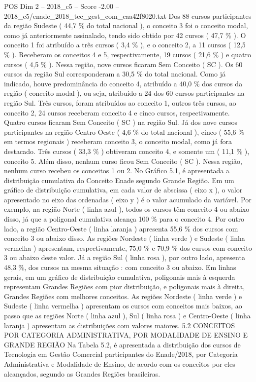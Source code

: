 \begin{textsample}{POS Dim 2 – 2018\_c5 – Score -2.00 – 2018\_c5/enade\_2018\_tec\_gest\_com\_caa42f8020.txt}
Dos 88 cursos participantes da região Sudeste ( 44,7 \% do total nacional ), o conceito 3 foi o conceito modal, como já anteriormente assinalado, tendo sido obtido por 42 cursos ( 47,7 \% ).
O conceito 1 foi atribuído a três cursos ( 3,4 \% ), e o conceito 2, a 11 cursos ( 12,5 \% ).
Receberam os conceitos 4 e 5, respectivamente, 19 cursos ( 21,6 \% ) e quatro cursos ( 4,5 \% ).
Nessa região, nove cursos ficaram Sem Conceito ( SC ).
Os 60 cursos da região Sul corresponderam a 30,5 \% do total nacional.
Como já indicado, houve predominância do conceito 4, atribuído a 40,0 \% dos cursos da região ( conceito modal ), ou seja, atribuído a 24 dos 60 cursos participantes na região Sul.
Três cursos, foram atribuídos ao conceito 1, outros três cursos, ao conceito 2, 24 cursos receberam conceito 4 e cinco cursos, respectivamente.
Quatro cursos ficaram Sem Conceito ( SC ) na região Sul.
Já dos nove cursos participantes na região Centro-Oeste ( 4,6 \% do total nacional ), cinco ( 55,6 \% em termos regionais ) receberam conceito 3, o conceito modal, como já fora destacado.
Três cursos ( 33,3 \% ) obtiveram conceito 4, e somente um ( 11,1 \% ), conceito 5.
Além disso, nenhum curso ficou Sem Conceito ( SC ).
Nessa região, nenhum curso recebeu os conceitos 1 ou 2.
No Gráfico 5.1, é apresentada a distribuição cumulativa do Conceito Enade segundo Grande Região.
Em um gráfico de distribuição cumulativa, em cada valor de abscissa ( eixo x ), o valor apresentado no eixo das ordenadas ( eixo y ) é o valor acumulado da variável.
Por exemplo, na região Norte ( linha azul ), todos os cursos têm conceito 4 ou abaixo disso, já que a poligonal cumulativa alcança 100 \% para o conceito 4.
Por outro lado, a região Centro-Oeste ( linha laranja ) apresenta 55,6 \% dos cursos com conceito 3 ou abaixo disso.
As regiões Nordeste ( linha verde ) e Sudeste ( linha vermelha ) apresentam, respectivamente, 75,0 \% e 70,9 \% dos cursos com conceito 3 ou abaixo deste valor.
Já a região Sul ( linha rosa ), por outro lado, apresenta 48,3 \%, dos cursos na mesma situação : com conceito 3 ou abaixo.
Em linhas gerais, em um gráfico de distribuição cumulativa, poligonais mais à esquerda representam Grandes Regiões com pior distribuição, e poligonais mais à direita, Grandes Regiões com melhores conceitos.
As regiões Nordeste ( linha verde ) e Sudeste ( linha vermelha ) apresentam os cursos com conceitos mais baixos, ao passo que as regiões Norte ( linha azul ), Sul ( linha rosa ) e Centro-Oeste ( linha laranja ) apresentam as distribuições com valores maiores. 5.2 CONCEITOS POR CATEGORIA ADMINISTRATIVA, POR MODALIDADE DE ENSINO E GRANDE REGIÃO Na Tabela 5.2, é apresentada a distribuição dos cursos de Tecnologia em Gestão Comercial participantes do Enade/2018, por Categoria Administrativa e Modalidade de Ensino, de acordo com os conceitos por eles alcançados, segundo as Grandes Regiões brasileiras.

\end{textsample}
